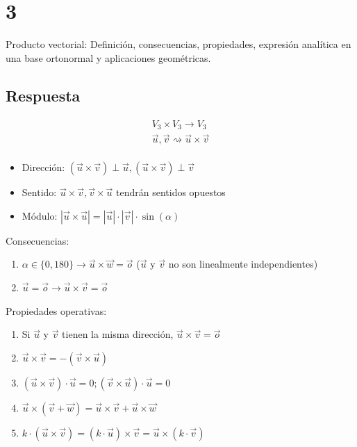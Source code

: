 \documentclass[
	12pt, %
	spanish, %
]{fphw}
\begin{document}
\section*{3}

\begin{problem}
	Producto vectorial: Definición, consecuencias, propiedades, expresión analítica
	en una base ortonormal y aplicaciones geométricas.	
	
\end{problem}


\subsection*{Respuesta}

\begin{gather*}
	V_3 \times V_3 \rightarrow V_3\\
	\vec{u}, \vec{v} \rightsquigarrow \vec{u} \times \vec{v}\\
\end{gather*}
\begin{itemize}
	\item Dirección: $(\vec{u} \times \vec{v}) \perp \vec{u}, (\vec{u} \times \vec{v}) \perp \vec{v}$\\
	\item Sentido: $\vec{u} \times \vec{v}, \vec{v} \times \vec{u}$ tendrán sentidos opuestos\\
	\item Módulo: $|\vec{u} \times \vec{u} | = |\vec{u}| \cdot |\vec{v}| \cdot \sin(\alpha)$\\
\end{itemize}

Consecuencias:

\begin{enumerate}
	\item $\alpha \in \{0,180\} \rightarrow \vec{u} \times \vec{w} = \vec{o}$ ($\vec{u}$ y $\vec{v}$ no son linealmente independientes)
	\item $\vec{u} = \vec{o} \rightarrow \vec{u} \times \vec{v} = \vec{o}$
\end{enumerate}


Propiedades operativas:

\begin{enumerate}
	\item Si $\vec{u}$ y $\vec{v}$ tienen la misma dirección, $\vec{u} \times \vec{v} = \vec{o}$
	\item $\vec{u} \times \vec{v} = -(\vec{v} \times\vec{u})$
	\item $(\vec{u} \times \vec{v}) \cdot \vec{u} = 0; (\vec{v} \times \vec{u}) \cdot \vec{u} = 0$
	\item $\vec{u} \times (\vec{v} + \vec{w}) = \vec{u} \times \vec{v} + \vec{u} \times \vec{w}$
	\item $k\cdot(\vec{u} \times \vec{v}) =( k \cdot \vec{u}) \times \vec{v}= \vec{u} \times (k \cdot\vec{v})$\\
\end{enumerate}
\end{document}
